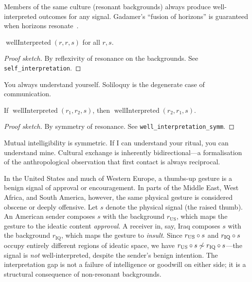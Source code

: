 \begin{remark}
Members of the same culture (resonant backgrounds) always produce
well-interpreted outcomes for any signal.  Gadamer's ``fusion of
horizons'' is guaranteed when horizons resonate~\cite{gadamer1960}.
\end{remark}

\begin{theorem}
\label{thm:self-interpretation}
$\operatorname{wellInterpreted}(r, r, s)$ for all $r, s$.
\end{theorem}

\begin{proof}[Proof sketch]
By reflexivity of resonance on the backgrounds.
See \texttt{self\_interpretation}.
\end{proof}

\begin{remark}
You always understand yourself.  Soliloquy is the degenerate case of
communication.
\end{remark}

\begin{theorem}
\label{thm:well-interp-symm}
If $\operatorname{wellInterpreted}(r_1, r_2, s)$, then
$\operatorname{wellInterpreted}(r_2, r_1, s)$.
\end{theorem}

\begin{proof}[Proof sketch]
By symmetry of resonance.  See \texttt{well\_interpretation\_symm}.
\end{proof}

\begin{remark}
Mutual intelligibility is symmetric.  If I can understand your ritual,
you can understand mine.  Cultural exchange is inherently
bidirectional---a formalisation of the anthropological observation that
first contact is always reciprocal.
\end{remark}

\begin{example}
In the United States and much of Western Europe, a thumbs-up gesture is
a benign signal of approval or encouragement.  In parts of the Middle
East, West Africa, and South America, however, the same physical gesture
is considered obscene or deeply offensive.  Let $s$ denote the physical
signal (the raised thumb).  An American sender composes $s$ with the
background $r_{\mathrm{US}}$, which maps the gesture to the ideatic
content \emph{approval}.  A receiver in, say, Iraq composes $s$ with the
background $r_{\mathrm{IQ}}$, which maps the gesture to \emph{insult}.
Since $r_{\mathrm{US}} \circ s$ and $r_{\mathrm{IQ}} \circ s$
occupy entirely different regions of ideatic space, we have
$r_{\mathrm{US}} \circ s \not\sim r_{\mathrm{IQ}} \circ s$---the
signal is \emph{not} well-interpreted, despite the sender's benign
intention.  The interpretation gap is not a failure of intelligence or
goodwill on either side; it is a structural consequence of non-resonant
backgrounds.
\end{example}

